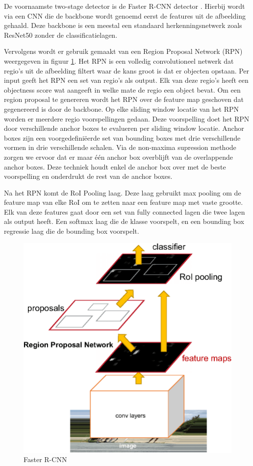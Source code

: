 De voornaamste two-stage detector is de Faster R-CNN detector \cite{ren_faster_2016}. 
Hierbij wordt via een CNN die de backbone wordt genoemd eerst de features uit de afbeelding gehaald.
Deze backbone is een meestal een standaard herkenningsnetwerk zoals ResNet50 zonder de classificatielagen.

Vervolgens wordt er gebruik gemaakt van een Region Proposal Network (RPN) weergegeven in figuur \ref{fig:faster-r-cnn}. 
Het RPN is een volledig convolutioneel netwerk dat regio's uit de afbeelding filtert waar de kans groot is dat er objecten opstaan.
Per input geeft het RPN een set van regio's als output.
Elk van deze regio's heeft een objectness score wat aangeeft in welke mate de regio een object bevat.
Om een region proposal te genereren wordt het RPN over de feature map geschoven dat gegenereerd is door de backbone.
Op elke sliding window locatie van het RPN worden er meerdere regio voorspellingen gedaan.
Deze voorspelling doet het RPN door verschillende anchor boxes te evalueren per sliding window locatie.
Anchor boxes zijn een voorgedefini\"eerde set van bounding boxes met drie verschillende vormen in drie verschillende schalen.
Via de non-maxima supression methode zorgen we ervoor dat er maar \'e\'en anchor box overblijft van de overlappende anchor boxes. 
Deze techniek houdt enkel de anchor box over met de beste voorspelling en onderdrukt de rest van de anchor boxes.

Na het RPN komt de RoI Pooling laag.
Deze laag gebruikt max pooling om de feature map van elke RoI om te zetten naar een feature map met vaste grootte.
Elk van deze features gaat door een set van fully connected lagen die twee lagen als output heeft.
Een softmax laag die de klasse voorspelt, en een bounding box regressie laag die de bounding box voorspelt.

\begin{figure}[!ht]
    \centering
 	\includegraphics[width=0.35\linewidth]{fig/Faster-R-CNN.png}
 	\caption{Faster R-CNN}
 	\label{fig:faster-r-cnn}
\end{figure}

